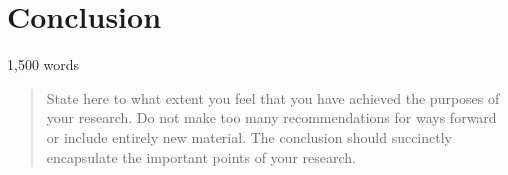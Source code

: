 \section{Conclusion}
1,500 words 

\begin{quote}
State here to what extent you feel that you have achieved the purposes of your research. Do not make too many recommendations for ways forward or include entirely new material. The conclusion should succinctly encapsulate the important points of your research.
\end{quote}